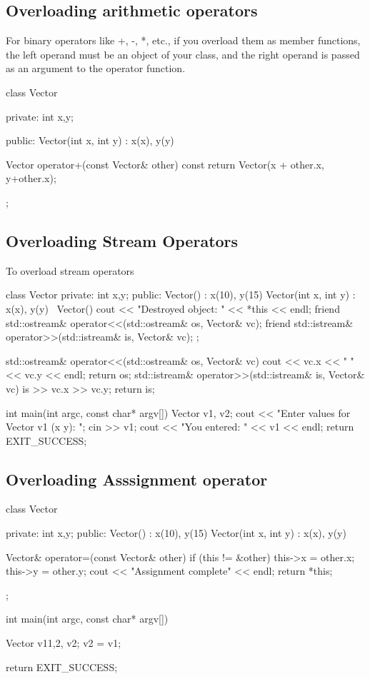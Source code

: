 \documentclass{report}
\begin{document}
    \subsection{Overloading arithmetic operators}
    \bigbreak \noindent 
    For binary operators like +, -, *, etc., if you overload them as member functions, the left operand must be an object of your class, and the right operand is passed as an argument to the operator function.
    \bigbreak \noindent 
    \begin{cppcode}
class Vector {
    private:
        int x,y;

    public:
        Vector(int x, int y) : x(x), y(y) {}

        Vector operator+(const Vector& other) const {
            return Vector(x + other.x, y+other.x);
        }
};
    \end{cppcode}
    \bigbreak \noindent 

    \bigbreak \noindent 
    \subsection{Overloading Stream Operators}
    To overload stream operators
    \bigbreak \noindent 
    \begin{cppcode}
class Vector {
    private:
        int x,y;
    public:
        Vector() : x(10), y(15) {}
        Vector(int x, int y) : x(x),  y(y) {}
        ~Vector() {
            cout << "Destroyed object: " << *this << endl;
        }
    friend std::ostream& operator<<(std::ostream& os, Vector& vc);
    friend std::istream& operator>>(std::istream& is, Vector& vc);
};

std::ostream& operator<<(std::ostream& os, Vector& vc) {
    cout << vc.x << " " << vc.y << endl;
    return os;
}
std::istream& operator>>(std::istream& is, Vector& vc) {
    is >> vc.x >> vc.y;
    return is;
}

int main(int argc, const char* argv[]) {
     Vector v1, v2;
    cout << "Enter values for Vector v1 (x y): ";
    cin >> v1;
    cout << "You entered: " << v1 << endl; return EXIT_SUCCESS; }
    \end{cppcode}
    \bigbreak \noindent 

    \pagebreak
    \subsection{Overloading Asssignment operator}
    \bigbreak \noindent 
    \begin{cppcode}
class Vector {
    private:
        int x,y;
    public:
        Vector() : x(10), y(15) {}
        Vector(int x, int y) : x(x),  y(y) {}

        Vector& operator=(const Vector& other) {
            if (this != &other) {
                this->x = other.x;
                this->y = other.y;
            }
            cout << "Assignment complete" << endl;
            return *this;
        }
};

int main(int argc, const char* argv[]) {
    Vector v1{1,2}, v2;
    v2 = v1;

    return EXIT_SUCCESS;
}
    \end{cppcode}
\end{document}
